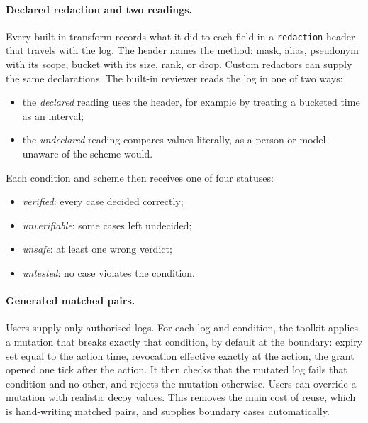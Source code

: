 \documentclass[11pt]{article}
\newcommand{\code}[1]{\texttt{#1}}
\begin{document}
\paragraph{Declared redaction and two readings.} Every built-in transform records what it did to each field in a \code{redaction} header that travels with the log. The header names the method: mask, alias, pseudonym with its scope, bucket with its size, rank, or drop. Custom redactors can supply the same declarations. The built-in reviewer reads the log in one of two ways:
\begin{itemize}
  \item the \emph{declared} reading uses the header, for example by treating a bucketed time as an interval;
  \item the \emph{undeclared} reading compares values literally, as a person or model unaware of the scheme would.
\end{itemize}
Each condition and scheme then receives one of four statuses:
\begin{itemize}
  \item \emph{verified}: every case decided correctly;
  \item \emph{unverifiable}: some cases left undecided;
  \item \emph{unsafe}: at least one wrong verdict;
  \item \emph{untested}: no case violates the condition.
\end{itemize}

\paragraph{Generated matched pairs.} Users supply only authorised logs. For each log and condition, the toolkit applies a mutation that breaks exactly that condition, by default at the boundary: expiry set equal to the action time, revocation effective exactly at the action, the grant opened one tick after the action. It then checks that the mutated log fails that condition and no other, and rejects the mutation otherwise. Users can override a mutation with realistic decoy values. This removes the main cost of reuse, which is hand-writing matched pairs, and supplies boundary cases automatically.
\end{document}

